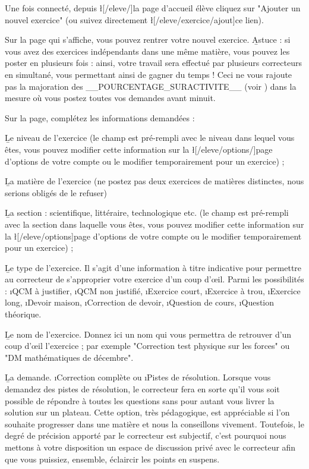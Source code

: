﻿Une fois connecté, depuis \l[/eleve/]{la page d'accueil élève} cliquez sur "Ajouter un nouvel exercice" (ou suivez directement \l[/eleve/exercice/ajout]{ce lien}).

Sur la page qui s'affiche, vous pouvez rentrer votre nouvel exercice.
\b{Astuce} : si vous avez des exercices indépendants dans une même matière, vous pouvez les poster en plusieurs fois : ainsi, votre travail sera effectué par plusieurs correcteurs en simultané, vous permettant ainsi de gagner du temps ! Ceci ne vous rajoute pas la majoration des __POURCENTAGE_SURACTIVITE__ (voir ) dans la mesure où vous postez toutes vos demandes avant minuit.

Sur la page, complétez les informations demandées :
\item \b{Le niveau de l'exercice} (le champ est pré-rempli avec le niveau dans lequel vous êtes, vous pouvez modifier cette information sur la \l[/eleve/options/]{page d'options de votre compte} ou le modifier temporairement pour un exercice) ;
\item \b{La matière} de l'exercice (ne postez pas deux exercices de matières distinctes, nous serions obligés de le refuser)
\item \b{La section} : scientifique, littéraire, technologique etc. (le champ est pré-rempli avec la section dans laquelle vous êtes, vous pouvez modifier cette information sur la \l[/eleve/options]{page d'options de votre compte} ou le modifier temporairement pour un exercice) ;
\item \b{Le type de l'exercice}. Il s'agit d'une information à titre indicative pour permettre au correcteur de s'approprier votre exercice d'un coup d'œil. Parmi les possibilités : \i{QCM à justifier}, \i{QCM non justifié}, \i{Exercice court}, \i{Exercice à trou}, \i{Exercice long}, \i{Devoir maison}, \i{Correction de devoir}, \i{Question de cours}, \i{Question théorique}.
\item \b{Le nom de l'exercice}. Donnez ici un nom qui vous permettra de retrouver d'un coup d'œil l'exercice ; par exemple "Correction test physique sur les forces" ou "DM mathématiques de décembre".
\item \b{La demande}. \i{Correction complète} ou \i{Pistes de résolution}. Lorsque vous demandez des pistes de résolution, le correcteur fera en sorte qu'il vous soit possible de répondre à toutes les questions sans pour autant vous livrer la solution sur un plateau. Cette option, très pédagogique, est appréciable si l'on souhaite progresser dans une matière et nous la conseillons vivement. Toutefois, le degré de précision apporté par le correcteur est subjectif, c'est pourquoi nous mettons à votre disposition un espace de discussion privé avec le correcteur afin que vous puissiez, ensemble, éclaircir les points en suspens.
